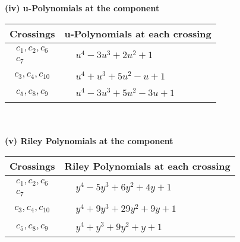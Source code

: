 \documentclass[1p]{elsarticle_modified}
\theoremstyle{definition}
\begin{document}
\newpage\renewcommand{\arraystretch}{1}
\flushleft \textbf{(iv) u-Polynomials at the component}\newline \\
\begin{tabular}{m{50pt}|m{274pt}}
Crossings & \hspace{64pt}u-Polynomials at each crossing \\
\hline $$\begin{aligned}c_{1},c_{2},c_{6}\\c_{7}\end{aligned}$$&$\begin{aligned}
&u^4-3 u^3+2 u^2+1
\end{aligned}$\\
\hline $$\begin{aligned}c_{3},c_{4},c_{10}\end{aligned}$$&$\begin{aligned}
&u^4+u^3+5 u^2- u+1
\end{aligned}$\\
\hline $$\begin{aligned}c_{5},c_{8},c_{9}\end{aligned}$$&$\begin{aligned}
&u^4-3 u^3+5 u^2-3 u+1
\end{aligned}$\\
\hline
\end{tabular}\\~\\
\newpage\renewcommand{\arraystretch}{1}
\flushleft \textbf{(v) Riley Polynomials at the component}\newline \\
\begin{tabular}{m{50pt}|m{274pt}}
Crossings & \hspace{64pt}Riley Polynomials at each crossing \\
\hline $$\begin{aligned}c_{1},c_{2},c_{6}\\c_{7}\end{aligned}$$&$\begin{aligned}
&y^4-5 y^3+6 y^2+4 y+1
\end{aligned}$\\
\hline $$\begin{aligned}c_{3},c_{4},c_{10}\end{aligned}$$&$\begin{aligned}
&y^4+9 y^3+29 y^2+9 y+1
\end{aligned}$\\
\hline $$\begin{aligned}c_{5},c_{8},c_{9}\end{aligned}$$&$\begin{aligned}
&y^4+y^3+9 y^2+y+1
\end{aligned}$\\
\hline
\end{tabular}\\~\\
\end{document}
